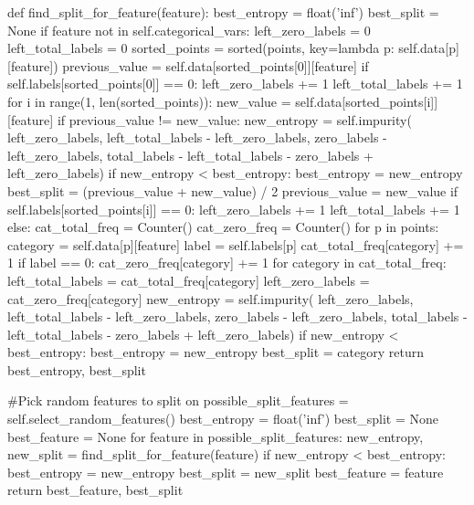 \documentclass{article}
\begin{document}
\begin{python}
        def find_split_for_feature(feature):
            best_entropy = float('inf')
            best_split = None
            if feature not in self.categorical_vars:
                left_zero_labels = 0
                left_total_labels = 0
                sorted_points = sorted(points, key=lambda p: self.data[p][feature])
                previous_value = self.data[sorted_points[0]][feature]
                if self.labels[sorted_points[0]] == 0:
                    left_zero_labels += 1
                left_total_labels += 1
                for i in range(1, len(sorted_points)):
                    new_value = self.data[sorted_points[i]][feature]
                    if previous_value != new_value:
                        new_entropy = self.impurity(
                            left_zero_labels,
                            left_total_labels - left_zero_labels,
                            zero_labels - left_zero_labels,
                            total_labels - left_total_labels - zero_labels + left_zero_labels)
                        if new_entropy < best_entropy:
                            best_entropy = new_entropy
                            best_split = (previous_value + new_value) / 2
                    previous_value = new_value
                    if self.labels[sorted_points[i]] == 0:
                        left_zero_labels += 1
                    left_total_labels += 1
            else:
                cat_total_freq = Counter()
                cat_zero_freq = Counter()
                for p in points:
                    category = self.data[p][feature]
                    label = self.labels[p]
                    cat_total_freq[category] += 1
                    if label == 0:
                        cat_zero_freq[category] += 1
                for category in cat_total_freq:
                    left_total_labels = cat_total_freq[category]
                    left_zero_labels = cat_zero_freq[category]
                    new_entropy = self.impurity(
                        left_zero_labels,
                        left_total_labels - left_zero_labels,
                        zero_labels - left_zero_labels,
                        total_labels - left_total_labels - zero_labels + left_zero_labels)
                    if new_entropy < best_entropy:
                        best_entropy = new_entropy
                        best_split = category
            return best_entropy, best_split

        #Pick random features to split on
        possible_split_features = self.select_random_features()
        best_entropy = float('inf')
        best_split = None
        best_feature = None
        for feature in possible_split_features:
            new_entropy, new_split = find_split_for_feature(feature)
            if new_entropy < best_entropy:
                best_entropy = new_entropy
                best_split = new_split
                best_feature = feature
        return best_feature, best_split


\end{python}
\end{document}
